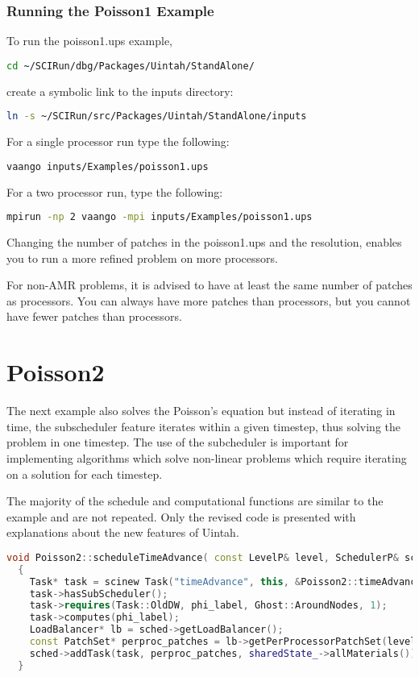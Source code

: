 \subsubsection{Running the Poisson1 Example}
To run the poisson1.ups example, 
\begin{lstlisting}[language=sh,backgroundcolor=\color{background}]
  cd ~/SCIRun/dbg/Packages/Uintah/StandAlone/
\end{lstlisting}
create a symbolic link to the inputs directory:
\begin{lstlisting}[language=sh,backgroundcolor=\color{background}]
  ln -s ~/SCIRun/src/Packages/Uintah/StandAlone/inputs
\end{lstlisting}
For a single processor run type the following:
\begin{lstlisting}[language=sh,backgroundcolor=\color{background}]
  vaango inputs/Examples/poisson1.ups
\end{lstlisting}
For a two processor run, type the following:
\begin{lstlisting}[language=sh,backgroundcolor=\color{background}]
  mpirun -np 2 vaango -mpi inputs/Examples/poisson1.ups
\end{lstlisting}
Changing the number of patches in the poisson1.ups and the resolution,
enables you to run a more refined problem on more processors.

 For non-AMR problems, it is advised to have at least
the same number of patches as processors.  You can always have more
patches than processors, but you cannot have fewer patches than
processors.


\section{Poisson2}

The next example also solves the Poisson's equation but instead of
iterating in time, the subscheduler feature iterates within a given
timestep, thus solving the problem in one timestep.  The use of the
subcheduler is important for implementing algorithms which solve
non-linear problems which require iterating on a solution for each
timestep.

The majority of the schedule and computational functions are similar
to the  example and are not repeated.  Only the revised
code is presented with explanations about the new features of Uintah.

\begin{lstlisting}[language=Cpp]
  void Poisson2::scheduleTimeAdvance( const LevelP& level, SchedulerP& sched)
  {
    Task* task = scinew Task("timeAdvance", this, &Poisson2::timeAdvance, level, sched.get_rep());
    task->hasSubScheduler();
    task->requires(Task::OldDW, phi_label, Ghost::AroundNodes, 1);
    task->computes(phi_label);
    LoadBalancer* lb = sched->getLoadBalancer();
    const PatchSet* perproc_patches = lb->getPerProcessorPatchSet(level);
    sched->addTask(task, perproc_patches, sharedState_->allMaterials());
  }

\end{lstlisting}

